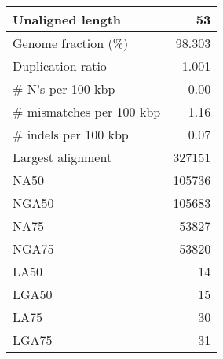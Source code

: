 \documentclass[12pt,a4paper]{article}
\begin{document}
\begin{table}[ht]
\begin{center}
\begin{tabular}{|l*{1}{|r}|}
Unaligned length & 53 \\ \hline
Genome fraction (\%) & 98.303 \\ \hline
Duplication ratio & 1.001 \\ \hline
\# N's per 100 kbp & 0.00 \\ \hline
\# mismatches per 100 kbp & 1.16 \\ \hline
\# indels per 100 kbp & 0.07 \\ \hline
Largest alignment & 327151 \\ \hline
NA50 & 105736 \\ \hline
NGA50 & 105683 \\ \hline
NA75 & 53827 \\ \hline
NGA75 & 53820 \\ \hline
LA50 & 14 \\ \hline
LGA50 & 15 \\ \hline
LA75 & 30 \\ \hline
LGA75 & 31 \\ \hline
\end{tabular}
\end{center}
\end{table}
\end{document}
